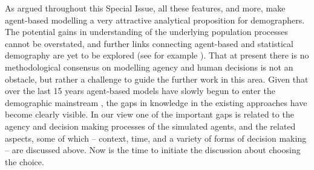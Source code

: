 \documentclass{article}
\begin{document}
As argued throughout this Special Issue, all these features, and more, make agent-based modelling a very attractive analytical proposition for demographers. The potential gains in understanding of the underlying population processes cannot be overstated, and further links connecting agent-based and statistical demography are yet to be explored (see for example \citet{Bijak2016}). That at present there is no methodological consensus on modelling agency and human decisions is not an obstacle, but rather a challenge to guide the further work in this area. Given that over the last 15 years agent-based models have slowly begun to enter the demographic mainstream \citep{Billari2003,VanBavel2016}, the gaps in knowledge in the existing approaches have become clearly visible. In our view one of the important gaps is related to the agency and decision making processes of the simulated agents, and the related aspects, some of which – context, time, and a variety of forms of decision making – are discussed above. Now is the time to initiate the discussion about choosing the choice. 



\end{document}
